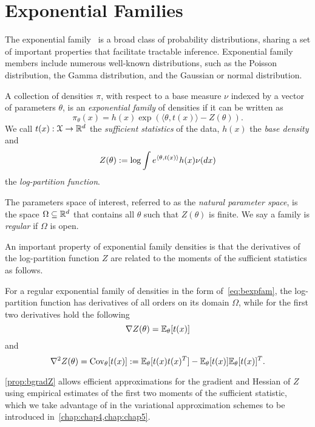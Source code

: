 \section{Exponential Families}
\label{sec:b-expfam}

The exponential family~\citep{wainwright08} is a broad class of probability distributions, sharing a set of important properties that facilitate tractable inference. Exponential family members include numerous well-known distributions, such as the Poisson distribution, the Gamma distribution, and the Gaussian or normal distribution. 

\begin{ndefn} \label{def:bexpfam}
	A collection of densities $\pi$, with respect to a base measure $\nu$ indexed by a vector of parameters $\theta$, is an \emph{exponential family} of densities if it can be written as
	\[
	\pi_{\theta}(x) = h(x) \exp\left( \langle \theta, t(x) \rangle - Z(\theta) \right).
	\label{eq:bexpfam}
	\]
	We call $t(x): \mathcal{X} \rightarrow \mathbb{R}^{d}$ the \emph{sufficient statistics} of the data, $h(x)$ the \emph{base density} and 
	\[
	Z(\theta):= \log \int e^{\langle \theta, t(x) \rangle } h(x) \nu(dx)
	\label{eq:b-logpartition}
	\]
	the \emph{log-partition function}.
\end{ndefn}

The parameters space of interest, referred to as the \emph{natural parameter space}, is the space $\Omega \subseteq \mathbb{R}^d $ that contains all $\theta$ such that $Z(\theta)$ is finite. We say a family is \emph{regular} if $\Omega$ is open.

An important property of exponential family densities is that the derivatives of the log-partition function $Z$ are related to the moments of the sufficient statistics as follows.

\begin{nprop} \label{prop:bgradZ}
	For a regular exponential family of densities in the form of~\cref{eq:bexpfam}, the log-partition function has derivatives of all orders on its domain $\Omega$, while for the first two derivatives hold the following
	\[
	\nabla Z(\theta) = \mathbb{E}_{\theta}[t(x)]
	\label{eq:bgradZ}
	\] 	
	and 
	\[
	\nabla^2Z(\theta) = \operatorname{Cov}_{\theta}[t(x)] := \mathbb{E}_{\theta}[t(x)t(x)^T] - \mathbb{E}_{\theta}[t(x)]\mathbb{E}_{\theta}[t(x)]^T.
	\label{eq:bhessZ}
	\]
\end{nprop}

\cref{prop:bgradZ} allows efficient approximations for the gradient and Hessian of $ Z $ using empirical estimates of the first two moments of the sufficient statistic, which we take advantage of in the variational approximation schemes to be introduced in~\cref{chap:chap4,chap:chap5}.

